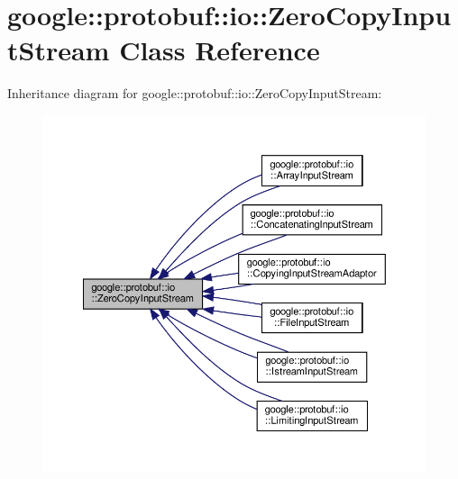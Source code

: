 \hypertarget{classgoogle_1_1protobuf_1_1io_1_1ZeroCopyInputStream}{}\section{google\+:\+:protobuf\+:\+:io\+:\+:Zero\+Copy\+Input\+Stream Class Reference}
\label{classgoogle_1_1protobuf_1_1io_1_1ZeroCopyInputStream}


Inheritance diagram for google\+:\+:protobuf\+:\+:io\+:\+:Zero\+Copy\+Input\+Stream\+:
\nopagebreak
\begin{figure}[H]
\begin{center}
\leavevmode
\includegraphics[width=350pt]{classgoogle_1_1protobuf_1_1io_1_1ZeroCopyInputStream__inherit__graph}
\end{center}
\end{figure}
